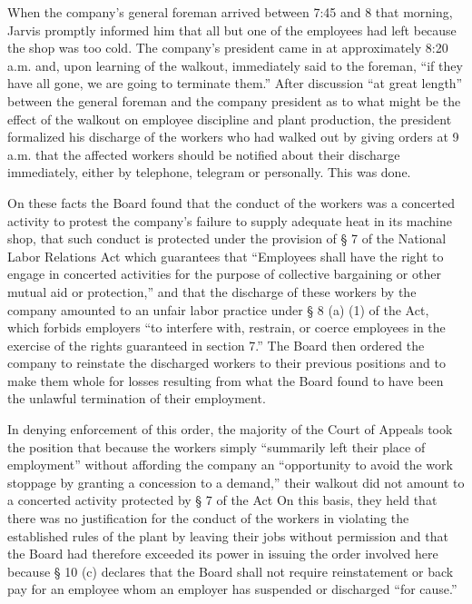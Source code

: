\documentclass[
  letterpaper,
  11pt,
  DIV=9,
  openright]{scrbook}
\begin{document}
When the company's general foreman arrived between 7:45 and 8 that
morning, Jarvis promptly informed him that all but one of the employees
had left because the shop was too cold. The company's president came in
at approximately 8:20 a.m. and, upon learning of the walkout,
immediately said to the foreman, ``if they have all gone, we are going
to terminate them.'' After discussion ``at great length'' between the
general foreman and the company president as to what might be the effect
of the walkout on employee discipline and plant production, the
president formalized his discharge of the workers who had walked out by
giving orders at 9 a.m. that the affected workers should be notified
about their discharge immediately, either by telephone, telegram or
personally. This was done.

On these facts the Board found that the conduct of the workers was a
concerted activity to protest the company's failure to supply adequate
heat in its machine shop, that such conduct is protected under the
provision of § 7 of the National Labor Relations Act which guarantees
that ``Employees shall have the right to engage in concerted activities
for the purpose of collective bargaining or other mutual aid or
protection,'' and that the discharge of these workers by the company
amounted to an unfair labor practice under § 8 (a) (1) of the Act, which
forbids employers ``to interfere with, restrain, or coerce employees in
the exercise of the rights guaranteed in section 7.'' The Board then
ordered the company to reinstate the discharged workers to their
previous positions and to make them whole for losses resulting from what
the Board found to have been the unlawful termination of their
employment.

In denying enforcement of this order, the majority of the Court of
Appeals took the position that because the workers simply ``summarily
left their place of employment'' without affording the company an
``opportunity to avoid the work stoppage by granting a concession to a
demand,'' their walkout did not amount to a concerted activity protected
by § 7 of the Act On this basis, they held that there was no
justification for the conduct of the workers in violating the
established rules of the plant by leaving their jobs without permission
and that the Board had therefore exceeded its power in issuing the order
involved here because § 10 (c) declares that the Board shall not require
reinstatement or back pay for an employee whom an employer has suspended
or discharged ``for cause.''
\end{document}
